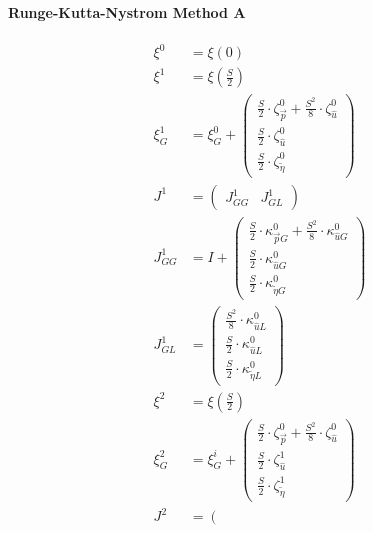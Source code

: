 \documentclass[review]{elsarticle}
\begin{document}
\paragraph{Runge-Kutta-Nystrom Method A}
\begin{equation} \begin{alignedat}{-1}
    \xi^{0}&=\xi\left(0\right) \\
    \xi^{1}&=\xi\left(\frac{S}{2}\right) \\
    \xi_{G}^{1}&=\xi_{G}^{0}+\left(\begin{array}{l}
        \frac{S}{2}\cdot\zeta_{\vec{p}}^{0}+\frac{S^{2}}{8}\cdot\zeta_{\hat{u}}^{0}\\
        \frac{S}{2}\cdot\zeta_{\hat{u}}^{0}\\
        \frac{S}{2}\cdot\zeta_{\tilde{\eta}}^{0}
    \end{array}\right) \\
    J^{1}&=\left(\begin{array}{cc}
        J_{GG}^{1} & J_{GL}^{1}
    \end{array}\right) \\
    J_{GG}^{1}&=I+\left(\begin{array}{l}
        \frac{S}{2}\cdot\kappa_{\vec{p}G}^{0}+\frac{S^{2}}{8}\cdot\kappa_{\hat{u}G}^{0}\\
        \frac{S}{2}\cdot\kappa_{\hat{u}G}^{0}\\
        \frac{S}{2}\cdot\kappa_{\tilde{\eta}G}^{0}
    \end{array}\right) \\
    J_{GL}^{1}&=\left(\begin{array}{l}
        \frac{S^{2}}{8}\cdot\kappa_{\hat{u}L}^{0}\\
        \frac{S}{2}\cdot\kappa_{\hat{u}L}^{0}\\
        \frac{S}{2}\cdot\kappa_{\tilde{\eta}L}^{0}
    \end{array}\right) \\
    \xi^{2}&=\xi\left(\frac{S}{2}\right) \\
    \xi_{G}^{2}&=\xi_{G}^{i}+\left(\begin{array}{l}
        \frac{S}{2}\cdot\zeta_{\vec{p}}^{0}+\frac{S^{2}}{8}\cdot\zeta_{\hat{u}}^{0}\\
        \frac{S}{2}\cdot\zeta_{\hat{u}}^{1}\\
        \frac{S}{2}\cdot\zeta_{\tilde{\eta}}^{1}
    \end{array}\right) \\
    J^{2}&=\left(\begin{array}{cc}

\end{array}
\end{alignedat}
\end{equation}
\end{document}

